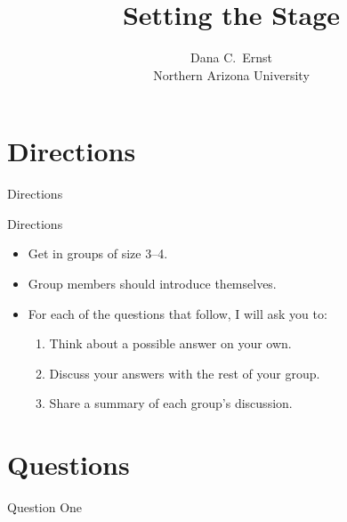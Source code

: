 \documentclass[10pt]{beamer}
\title{Setting the Stage}
\subtitle{}
\author{{\large Dana C.~Ernst}\\
Northern Arizona University}
\date{}
\begin{document}

\maketitle


\section{Directions}


\begin{frame}{Directions}

\begin{block}{Directions}
\vspace{-.5em}
\begin{itemize}
\item Get in groups of size 3--4.
\item Group members should introduce themselves.
\item For each of the questions that follow, I will ask you to:
\begin{enumerate}
\item \alert{Think} about a possible answer on your own.
\item \alert{Discuss} your answers with the rest of your group.
\item \alert{Share} a summary of each group's discussion.
\end{enumerate}
\end{itemize}
\end{block}

\end{frame}


\section{Questions}


\begin{frame}{Question One}
\ 


\end{frame}
\end{document}
